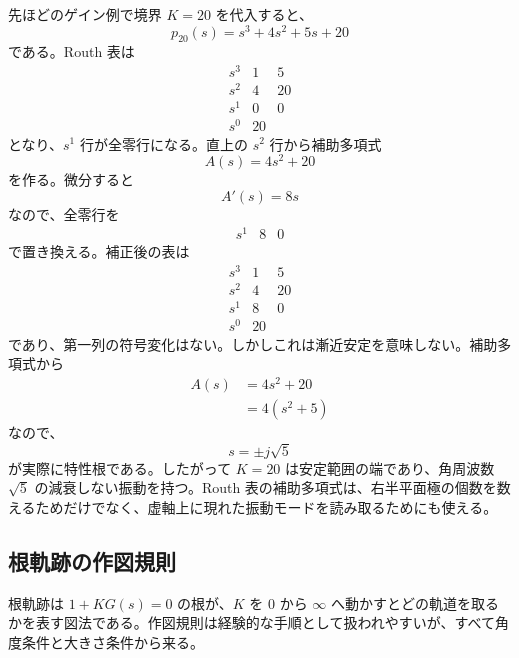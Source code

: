 先ほどのゲイン例で境界 $K=20$ を代入すると、
\begin{equation}
  p_{20}(s)=s^3+4s^2+5s+20
\end{equation}
である。Routh 表は
\begin{equation}
\begin{array}{c|cc}
s^3&1&5\\
s^2&4&20\\
s^1&0&0\\
s^0&20&
\end{array}
\end{equation}
となり、$s^1$ 行が全零行になる。直上の $s^2$ 行から補助多項式
\begin{equation}
  A(s)=4s^2+20
\end{equation}
を作る。微分すると
\begin{equation}
  A'(s)=8s
\end{equation}
なので、全零行を
\begin{equation}
\begin{array}{c|cc}
s^1&8&0
\end{array}
\end{equation}
で置き換える。補正後の表は
\begin{equation}
\begin{array}{c|cc}
s^3&1&5\\
s^2&4&20\\
s^1&8&0\\
s^0&20&
\end{array}
\end{equation}
であり、第一列の符号変化はない。しかしこれは漸近安定を意味しない。補助多項式から
\begin{align}
  A(s)&=4s^2+20\\
  &=4(s^2+5)
\end{align}
なので、
\begin{equation}
  s=\pm j\sqrt{5}
\end{equation}
が実際に特性根である。したがって $K=20$ は安定範囲の端であり、角周波数 $\sqrt{5}$ の減衰しない振動を持つ。Routh 表の補助多項式は、右半平面極の個数を数えるためだけでなく、虚軸上に現れた振動モードを読み取るためにも使える。

\subsection{根軌跡の作図規則}

根軌跡は $1+KG(s)=0$ の根が、$K$ を 0 から $\infty$ へ動かすとどの軌道を取るかを表す図法である。作図規則は経験的な手順として扱われやすいが、すべて角度条件と大きさ条件から来る。

